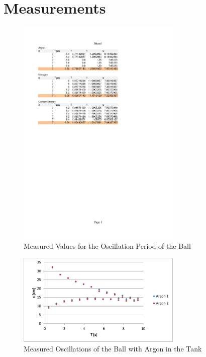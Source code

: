 \documentclass{scrreprt}
\begin{document}
\section{Measurements}
\begin{figure}[H]
	\centering
  \includegraphics[width=0.7\textwidth]{diag/rawvals.pdf}
	\caption{Measured Values for the Oscillation Period of the Ball}
	\label{fig:measurement}
\end{figure}

\begin{figure}[H]
	\centering
  \includegraphics[width=0.7\textwidth]{diag/argon.pdf}
	\caption{Measured Oscillations of the Ball with Argon in the Tank}
	\label{fig:argon}
\end{figure}
\end{document}
